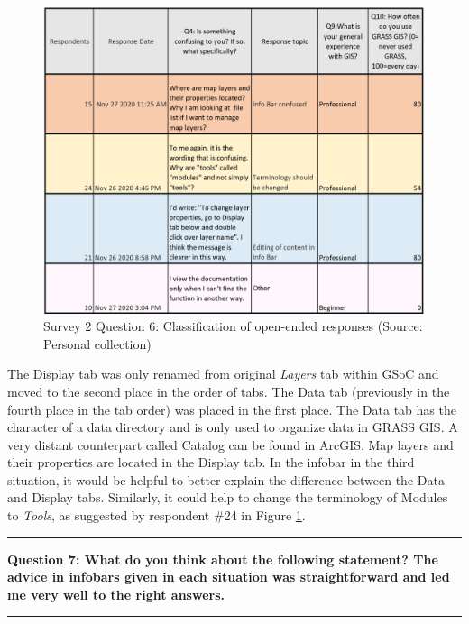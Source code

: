 \documentclass[a4paper,10pt,twoside]{article}
\begin{document}
\begin{figure}[hbt!] 
\begin{center}
\includegraphics[width=14.5cm]{../surveys/analyzed_data/survey2_question6.png} 
\caption[Survey 2 Question 6: Classification of open-ended responses]{Survey 2 Question 6: Classification of open-ended responses (Source: Personal collection)}
\label{fig:survey2_question6}
\end{center}
\end{figure}

\newpage
\noindent The Display tab was only renamed from original
\textit{Layers} tab within GSoC and moved to the second place in the
order of tabs. The Data tab (previously in the fourth place in the tab
order) was placed in the first place. The Data tab has the character
of a data directory and is only used to organize data in GRASS GIS. A
very distant counterpart called Catalog can be found in ArcGIS. Map
layers and their properties are located in the Display tab. In the
infobar in the third situation, it would be helpful to better explain
the difference between the Data and Display tabs. Similarly, it could
help to change the terminology of Modules to \textit{Tools}, as
suggested by respondent \#24 in Figure \ref{fig:survey2_question6}.

\par\noindent\rule{\textwidth}{0.4pt}
\noindent \textbf{Question 7: What do you think about the following statement? The advice in infobars given in each situation was straightforward and led me very well to the right answers.}
\par\noindent\rule{\textwidth}{0.4pt}
\end{document}
